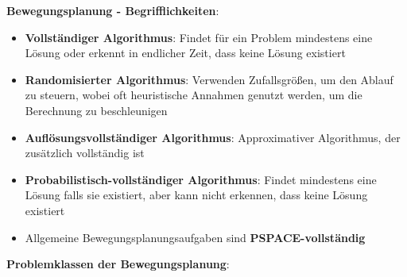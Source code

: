 \textbf{Bewegungsplanung - Begrifflichkeiten}:
\begin{itemize}
	\item \textbf{Vollständiger Algorithmus}: Findet für ein Problem mindestens eine Lösung oder erkennt in endlicher Zeit, dass keine Lösung existiert
	\item \textbf{Randomisierter Algorithmus}: Verwenden Zufallsgrößen, um den Ablauf zu steuern, wobei oft heuristische Annahmen genutzt werden, um die Berechnung zu beschleunigen
	\item \textbf{Auflösungsvollständiger Algorithmus}: Approximativer Algorithmus, der zusätzlich vollständig ist
	\item \textbf{Probabilistisch-vollständiger Algorithmus}: Findet mindestens eine Lösung falls sie existiert, aber kann nicht erkennen, dass keine Lösung existiert
	\item Allgemeine Bewegungsplanungsaufgaben sind \textbf{PSPACE-vollständig}
\end{itemize}
\bigskip
\textbf{Problemklassen der Bewegungsplanung}:
